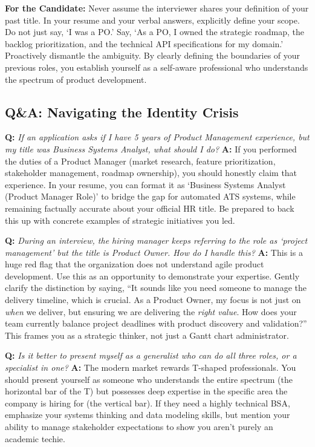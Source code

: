 \documentclass[
  11pt,
  openany,
  oneside]{book}
\renewenvironment{quote}{\begin{customquote}}{\end{customquote}}
\begin{document}
\begin{quote}
\textbf{For the Candidate:} Never assume the interviewer shares your
definition of your past title. In your resume and your verbal answers,
explicitly define your scope. Do not just say, `I was a PO.' Say, `As a
PO, I owned the strategic roadmap, the backlog prioritization, and the
technical API specifications for my domain.' Proactively dismantle the
ambiguity. By clearly defining the boundaries of your previous roles,
you establish yourself as a self-aware professional who understands the
spectrum of product development.
\end{quote}

\subsection{Q\&A: Navigating the Identity
Crisis}\label{qa-navigating-the-identity-crisis}

\textbf{Q:} \emph{If an application asks if I have 5 years of Product
Management experience, but my title was Business Systems Analyst, what
should I do?} \textbf{A:} If you performed the duties of a Product
Manager (market research, feature prioritization, stakeholder
management, roadmap ownership), you should honestly claim that
experience. In your resume, you can format it as `Business Systems
Analyst (Product Manager Role)' to bridge the gap for automated ATS
systems, while remaining factually accurate about your official HR
title. Be prepared to back this up with concrete examples of strategic
initiatives you led.

\textbf{Q:} \emph{During an interview, the hiring manager keeps
referring to the role as `project management' but the title is Product
Owner. How do I handle this?} \textbf{A:} This is a huge red flag that
the organization does not understand agile product development. Use this
as an opportunity to demonstrate your expertise. Gently clarify the
distinction by saying, ``It sounds like you need someone to manage the
delivery timeline, which is crucial. As a Product Owner, my focus is not
just on \emph{when} we deliver, but ensuring we are delivering the
\emph{right value}. How does your team currently balance project
deadlines with product discovery and validation?'' This frames you as a
strategic thinker, not just a Gantt chart administrator.

\textbf{Q:} \emph{Is it better to present myself as a generalist who can
do all three roles, or a specialist in one?} \textbf{A:} The modern
market rewards T-shaped professionals. You should present yourself as
someone who understands the entire spectrum (the horizontal bar of the
T) but possesses deep expertise in the specific area the company is
hiring for (the vertical bar). If they need a highly technical BSA,
emphasize your systems thinking and data modeling skills, but mention
your ability to manage stakeholder expectations to show you aren't
purely an academic techie.
\end{document}
